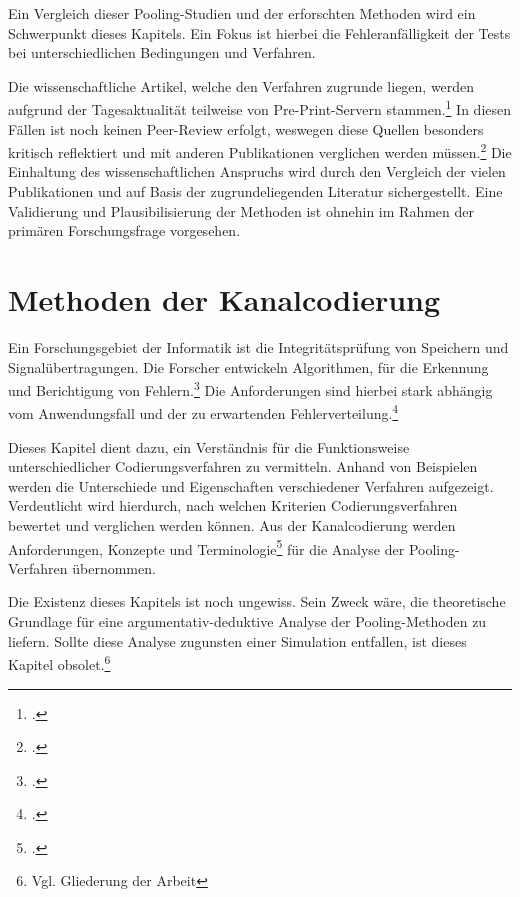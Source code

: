Ein Vergleich dieser Pooling-Studien und der erforschten Methoden wird ein Schwerpunkt dieses Kapitels.
Ein Fokus ist hierbei die Fehleranfälligkeit der Tests bei unterschiedlichen Bedingungen und Verfahren.

Die wissenschaftliche Artikel, welche den Verfahren zugrunde liegen, werden aufgrund der Tagesaktualität teilweise von Pre-Print-Servern stammen.\footcite{viehweger_increased_2020}
In diesen Fällen ist noch keinen Peer-Review erfolgt, weswegen diese Quellen besonders kritisch reflektiert und mit anderen Publikationen verglichen werden müssen.\footcite{verwilt_evaluation_2021}
Die Einhaltung des wissenschaftlichen Anspruchs wird durch den Vergleich der vielen Publikationen und auf Basis der zugrundeliegenden Literatur sichergestellt.
Eine Validierung und Plausibilisierung der Methoden ist ohnehin im Rahmen der primären Forschungsfrage vorgesehen.

\section{Methoden der Kanalcodierung}
Ein Forschungsgebiet der Informatik ist die Integritätsprüfung von Speichern und Signalübertragungen.
Die Forscher entwickeln Algorithmen, für die Erkennung und Berichtigung von Fehlern.\footcite{hamming_information_1987}
Die Anforderungen sind hierbei stark abhängig vom Anwendungsfall und der zu erwartenden Fehlerverteilung.\footcite{blahut_algebraic_1992}

Dieses Kapitel dient dazu, ein Verständnis für die Funktionsweise unterschiedlicher Codierungsverfahren zu vermitteln.
Anhand von Beispielen werden die Unterschiede und Eigenschaften verschiedener Verfahren aufgezeigt.
Verdeutlicht wird hierdurch, nach welchen Kriterien Codierungsverfahren bewertet und verglichen werden können.
Aus der Kanalcodierung werden Anforderungen, Konzepte und Terminologie\footcite{dankmeier_codierung_1994}
für die Analyse der Pooling-Verfahren übernommen.

Die Existenz dieses Kapitels ist noch ungewiss.
Sein Zweck wäre, die theoretische Grundlage für eine argumentativ-deduktive Analyse der Pooling-Methoden zu liefern.
Sollte diese Analyse zugunsten einer Simulation entfallen, ist dieses Kapitel obsolet.\footnote{Vgl. Gliederung der Arbeit}